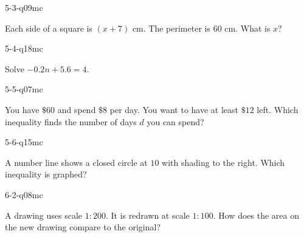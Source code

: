 \begin{practiceQuestion}{5-3-q09}{mc}
\begin{questionText}
Each side of a square is $(x + 7)$ cm. The perimeter is $60$ cm. What is $x$?
\end{questionText}
\end{practiceQuestion}

\begin{practiceQuestion}{5-4-q18}{mc}
\begin{questionText}
Solve $-0.2n + 5.6 = 4$.
\end{questionText}
\end{practiceQuestion}

\begin{practiceQuestion}{5-5-q07}{mc}
\begin{questionText}
You have $\$60$ and spend $\$8$ per day. You want to have at least $\$12$ left. Which inequality finds the number of days $d$ you can spend?
\end{questionText}
\end{practiceQuestion}

\begin{practiceQuestion}{5-6-q15}{mc}
\begin{questionText}
A number line shows a closed circle at $10$ with shading to the right. Which inequality is graphed?
\end{questionText}
\end{practiceQuestion}

\begin{practiceQuestion}{6-2-q08}{mc}
\begin{questionText}
A drawing uses scale $1:200$. It is redrawn at scale $1:100$. How does the area on the new drawing compare to the original?
\end{questionText}
\end{practiceQuestion}


